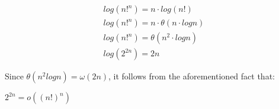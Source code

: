 \documentclass[a4paper]{report}
\begin{document}
\begin{enumerate}
      \begin{align}
        log(n!^{n}) = n \cdot log(n!)\\
        log(n!^{n}) = n \cdot \theta(n \cdot log n)\\
        log(n!^{n}) = \theta(n^2 \cdot log n)\\
        log(2^{2n}) = 2n 
      \end{align}

      Since $\theta(n^2 log n) = \omega(2n)$, it follows from the aforementioned fact that:

      $2^{2n} = o((n!)^{n})$

      







      
  \end{enumerate}

  
  
\end{document}
